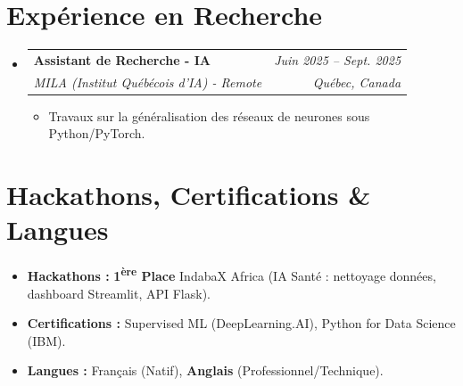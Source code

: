 \documentclass[a4paper,11pt]{article}
\makeatletter
\newcommand{\resumeSubheading}[4]{
  \vspace{-1pt}\item
    \begin{tabular*}{0.97\textwidth}[t]{l@{\extracolsep{\fill}}r}
      \textbf{#1} & \textit{\small #2} \\
      \textit{\small #3} & \textit{\small #4} \\
    \end{tabular*}\vspace{-5pt}
}
\makeatother
\begin{document}
\section{Expérience en Recherche}
\begin{itemize}[leftmargin=*, label={-}]
    \resumeSubheading
      {Assistant de Recherche - IA}{Juin 2025 -- Sept. 2025}
      {MILA (Institut Québécois d'IA) - Remote}{Québec, Canada}
      \begin{itemize}[leftmargin=0.4cm, nosep, label=\tiny$\bullet$]
        \item \small{Travaux sur la généralisation des réseaux de neurones sous Python/PyTorch.}
      \end{itemize}
\end{itemize}

\section{Hackathons, Certifications \& Langues}
\begin{itemize}[leftmargin=*, nosep]
    \item \textbf{Hackathons :} \textbf{1\textsuperscript{ère} Place} IndabaX Africa (IA Santé : nettoyage données, dashboard Streamlit, API Flask).
    \item \textbf{Certifications :} Supervised ML (DeepLearning.AI), Python for Data Science (IBM).
    \item \textbf{Langues :} Français (Natif), \textbf{Anglais} (Professionnel/Technique).
\end{itemize}
\end{document}
